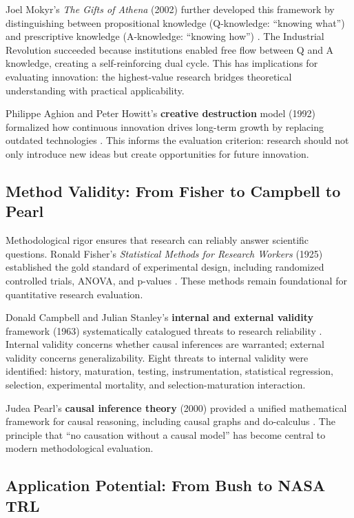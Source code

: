 Joel Mokyr's \textit{The Gifts of Athena} (2002) further developed this framework by distinguishing between propositional knowledge (Q-knowledge: ``knowing what'') and prescriptive knowledge (A-knowledge: ``knowing how'') \citep{mokyr2002gifts}. The Industrial Revolution succeeded because institutions enabled free flow between Q and A knowledge, creating a self-reinforcing dual cycle. This has implications for evaluating innovation: the highest-value research bridges theoretical understanding with practical applicability.

Philippe Aghion and Peter Howitt's \textbf{creative destruction} model (1992) formalized how continuous innovation drives long-term growth by replacing outdated technologies \citep{aghion1992model}. This informs the evaluation criterion: research should not only introduce new ideas but create opportunities for future innovation.

\subsection{Method Validity: From Fisher to Campbell to Pearl}

Methodological rigor ensures that research can reliably answer scientific questions. Ronald Fisher's \textit{Statistical Methods for Research Workers} (1925) established the gold standard of experimental design, including randomized controlled trials, ANOVA, and p-values \citep{fisher1925statistical}. These methods remain foundational for quantitative research evaluation.

Donald Campbell and Julian Stanley's \textbf{internal and external validity} framework (1963) systematically catalogued threats to research reliability \citep{campbell1963experimental}. Internal validity concerns whether causal inferences are warranted; external validity concerns generalizability. Eight threats to internal validity were identified: history, maturation, testing, instrumentation, statistical regression, selection, experimental mortality, and selection-maturation interaction.

Judea Pearl's \textbf{causal inference theory} (2000) provided a unified mathematical framework for causal reasoning, including causal graphs and do-calculus \citep{pearl2009causality}. The principle that ``no causation without a causal model'' has become central to modern methodological evaluation.

\subsection{Application Potential: From Bush to NASA TRL}

